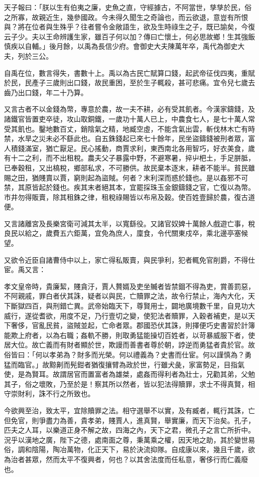 \begin{pinyinscope}
天子報曰：「朕以生有伯夷之廉，史魚之直，守經據古，不阿當世，孳孳於民，俗之所寡，故親近生，幾參國政。今未得久聞生之奇論也，而云欲退，意豈有所恨與？將在位者與生殊乎？往者嘗令金敞語生，欲及生時祿生之子，既已諭矣，今復云子少。夫以王命辨護生家，雖百子何以加？傳曰亡懷土，何必思故鄉！生其強飯慎疾以自輔。」後月餘，以禹為長信少府。會御史大夫陳萬年卒，禹代為御史大夫，列於三公。

自禹在位，數言得失，書數十上。禹以為古民亡賦算口錢，起武帝征伐四夷，重賦於民，民產子三歲則出口錢，故民重困，至於生子輒殺，甚可悲痛。宜令兒七歲去齒乃出口錢，年二十乃算。

又言古者不以金錢為幣，專意於農，故一夫不耕，必有受其飢者。今漢家鑄錢，及諸鐵官皆置吏卒徒，攻山取銅鐵，一歲功十萬人已上，中農食七人，是七十萬人常受其飢也。鑿地數百丈，銷陰氣之精，地臧空虛，不能含氣出雲，斬伐林木亡有時禁，水旱之災未必不繇此也。自五銖錢起已來七十餘年，民坐盜鑄錢被刑者眾，富人積錢滿室，猶亡厭足。民心搖動，商賈求利，東西南北各用智巧，好衣美食，歲有十二之利，而不出租稅。農夫父子暴露中野，不避寒暑，捽屮杷土，手足胼胝，已奉穀租，又出槁稅，鄉部私求，不可勝供。故民棄本逐末，耕者不能半。貧民雖賜之田，猶賤賣以賈，窮則起為盜賊。何者？末利深而惑於錢也。是以姦邪不可禁，其原皆起於錢也。疾其末者絕其本，宜罷採珠玉金銀鑄錢之官，亡復以為幣。市井勿得販賣，除其租銖之律，租稅祿賜皆以布帛及穀。使百姓壹歸於農，復古道便。

又言諸離宮及長樂宮衛可減其太半，以寬繇役。又諸官奴婢十萬餘人戲遊亡事，稅良民以給之，歲費五六鉅萬，宜免為庶人，廩食，令代關東戍卒，乘北邊亭塞候望。

又欲令近臣自諸曹侍中以上，家亡得私販賣，與民爭利，犯者輒免官削爵，不得仕宦。禹又言：

孝文皇帝時，貴廉絜，賤貪汙，賈人贅婿及吏坐贓者皆禁錮不得為吏，賞善罰惡，不阿親戚，罪白者伏其誅，疑者以與民，亡贖罪之法，故令行禁止，海內大化，天下斷獄四百，與刑錯亡異。武帝始臨天下，尊賢用士，闢地廣境數千里，自見功大威行，遂從耆欲，用度不足，乃行壹切之變，使犯法者贖罪，入穀者補吏，是以天下奢侈，官亂民貧，盜賊並起，亡命者眾。郡國恐伏其誅，則擇便巧史書習於計簿能欺上府者，以為右職；姦軌不勝，則取勇猛能操切百姓者，以苛暴威服下者，使居大位。故亡義而有財者顯於世，欺謾而善書者尊於朝，誖逆而勇猛者貴於官。故俗皆曰：「何以孝弟為？財多而光榮。何以禮義為？史書而仕宦。何以謹慎為？勇猛而臨官。」故黥劓而髡鉗者猶復攘臂為政於世，行雖犬彘，家富勢足，目指氣使，是為賢耳。故謂居官而置富者為雄桀，處姦而得利者為壯士，兄勸其弟，父勉其子，俗之壞敗，乃至於是！察其所以然者，皆以犯法得贖罪，求士不得真賢，相守崇財利，誅不行之所致也。

今欲興至治，致太平，宜除贖罪之法。相守選舉不以實，及有臧者，輒行其誅，亡但免官，則爭盡力為善，貴孝弟，賤賈人，進真賢，舉實廉，而天下治矣。孔子，匹夫之人耳，以樂道正身不解之故，四海之內，天下之君，微孔子之言亡所折中。況乎以漢地之廣，陛下之德，處南面之尊，秉萬乘之權，因天地之助，其於變世易俗，調和陰陽，陶冶萬物，化正天下，易於決流抑隊。自成康以來，幾且千歲，欲為治者甚眾，然而太平不復興者，何也？以其舍法度而任私意，奢侈行而仁義廢也。


\end{pinyinscope}
